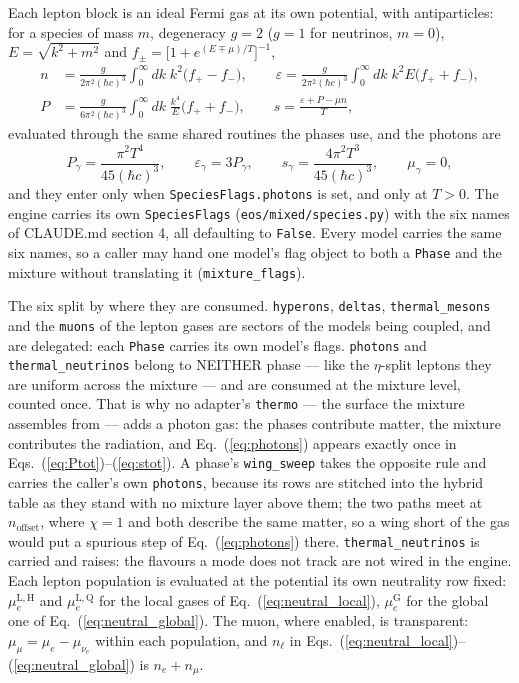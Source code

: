 \documentclass[aps,prc,onecolumn,superscriptaddress,nofootinbib,10pt]{revtex4-2}
\newcommand{\phH}{\mathrm{H}}
\newcommand{\phQ}{\mathrm{Q}}
\begin{document}
Each lepton block is an ideal Fermi gas at its own potential, with
antiparticles: for a species of mass $m$, degeneracy $g = 2$ ($g = 1$ for
neutrinos, $m = 0$), $E = \sqrt{k^2 + m^2}$ and
$f_\pm = \big[ 1 + e^{(E \mp \mu)/T} \big]^{-1}$,
%
\begin{align}
n &= \frac{g}{2\pi^2 (\hbar c)^3} \int_0^\infty \!\! dk\; k^2
     \big( f_+ - f_- \big) ,
\qquad
\varepsilon = \frac{g}{2\pi^2 (\hbar c)^3} \int_0^\infty \!\! dk\; k^2 E
     \big( f_+ + f_- \big) ,
\nonumber\\
P &= \frac{g}{6\pi^2 (\hbar c)^3} \int_0^\infty \!\! dk\; \frac{k^4}{E}
     \big( f_+ + f_- \big) ,
\qquad
s = \frac{\varepsilon + P - \mu n}{T} ,
\label{eq:leptonkin}
\end{align}
%
evaluated through the same shared routines the phases use, and the photons are
%
\begin{equation}
P_\gamma = \frac{\pi^2 T^4}{45 (\hbar c)^3}, \qquad
\varepsilon_\gamma = 3 P_\gamma, \qquad
s_\gamma = \frac{4\pi^2 T^3}{45 (\hbar c)^3} , \qquad \mu_\gamma = 0 ,
\label{eq:photons}
\end{equation}
%
and they enter only when \texttt{SpeciesFlags.photons} is set, and only at
$T > 0$. The engine carries its own \texttt{SpeciesFlags}
(\texttt{eos/mixed/species.py}) with the six names of CLAUDE.md section 4, all
defaulting to \texttt{False}. Every model carries the same six names, so a
caller may hand one model's flag object to both a \texttt{Phase} and the
mixture without translating it (\texttt{mixture\_flags}).

The six split by where they are consumed. \texttt{hyperons},
\texttt{deltas}, \texttt{thermal\_mesons} and the \texttt{muons} of the
lepton gases are sectors of the models being coupled, and are delegated: each
\texttt{Phase} carries its own model's flags. \texttt{photons} and
\texttt{thermal\_neutrinos} belong to NEITHER phase --- like the
$\eta$-split leptons they are uniform across the mixture --- and are consumed
at the mixture level, counted once. That is why no adapter's \texttt{thermo}
--- the surface the mixture assembles from --- adds a photon gas: the phases
contribute matter, the mixture contributes the radiation, and
Eq.~(\ref{eq:photons}) appears exactly once in
Eqs.~(\ref{eq:Ptot})--(\ref{eq:stot}). A phase's \texttt{wing\_sweep} takes
the opposite rule and carries the caller's own \texttt{photons}, because its
rows are stitched into the hybrid table as they stand with no mixture layer
above them; the two paths meet at $n_{\mathrm{offset}}$, where $\chi = 1$ and
both describe the same matter, so a wing short of the gas would put a spurious
step of Eq.~(\ref{eq:photons}) there.
\texttt{thermal\_neutrinos} is carried and raises:
the flavours a mode does not track are not wired in the engine.
%
Each lepton population is evaluated at the potential its own neutrality row
fixed: $\mu_e^{\mathrm{L},\phH}$ and $\mu_e^{\mathrm{L},\phQ}$ for the local
gases of Eq.~(\ref{eq:neutral_local}), $\mu_e^{\mathrm{G}}$ for the global one
of Eq.~(\ref{eq:neutral_global}). The muon, where enabled, is transparent:
$\mu_\mu = \mu_e - \mu_{\nu_e}$ within each population, and $n_\ell$ in
Eqs.~(\ref{eq:neutral_local})--(\ref{eq:neutral_global}) is $n_e + n_\mu$.
\end{document}
